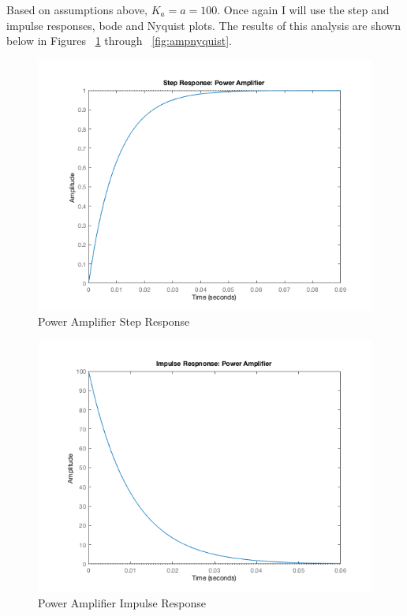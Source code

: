 \documentclass[12pt]{article}
\begin{document}
Based on assumptions above, $K_{a} = a = 100$. Once again I will use the step and impulse responses, bode and Nyquist plots. The results of this analysis are shown below in Figures ~\ref{fig:ampstep} through ~\ref{fig:ampnyquist}.

\begin{figure}[H]
\begin{center}
	\includegraphics[width=\textwidth]{./img/AmpStep.png}
	\caption{\label{fig:ampstep}Power Amplifier Step Response}
\end{center}
\end{figure}

\begin{figure}[H]
\begin{center}
	\includegraphics[width=\textwidth]{./img/AmpImpulse.png}
	\caption{\label{fig:ampimpulse}Power Amplifier Impulse Response}
\end{center}
\end{figure}
\end{document}
